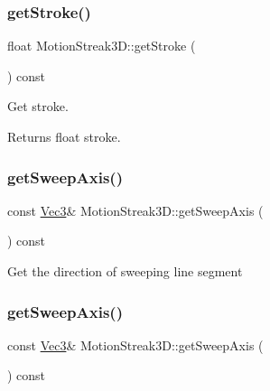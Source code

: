 \subsubsection{\texorpdfstring{get\+Stroke()}{getStroke()}\hspace{0.1cm}{\footnotesize\ttfamily [2/2]}}
{\footnotesize\ttfamily float Motion\+Streak3\+D\+::get\+Stroke (\begin{DoxyParamCaption}{ }\end{DoxyParamCaption}) const\hspace{0.3cm}{\ttfamily [inline]}}

Get stroke.

\begin{DoxyReturn}{Returns}
float stroke. 
\end{DoxyReturn}
\mbox{\label{classMotionStreak3D_aa6cd925496130156b4aadf09bcfc9b32}} 
\subsubsection{\texorpdfstring{get\+Sweep\+Axis()}{getSweepAxis()}\hspace{0.1cm}{\footnotesize\ttfamily [1/2]}}
{\footnotesize\ttfamily const \hyperlink{classVec3}{Vec3}\& Motion\+Streak3\+D\+::get\+Sweep\+Axis (\begin{DoxyParamCaption}{ }\end{DoxyParamCaption}) const\hspace{0.3cm}{\ttfamily [inline]}}

Get the direction of sweeping line segment \mbox{\label{classMotionStreak3D_aa6cd925496130156b4aadf09bcfc9b32}} 
\subsubsection{\texorpdfstring{get\+Sweep\+Axis()}{getSweepAxis()}\hspace{0.1cm}{\footnotesize\ttfamily [2/2]}}
{\footnotesize\ttfamily const \hyperlink{classVec3}{Vec3}\& Motion\+Streak3\+D\+::get\+Sweep\+Axis (\begin{DoxyParamCaption}{ }\end{DoxyParamCaption}) const\hspace{0.3cm}{\ttfamily [inline]}}

